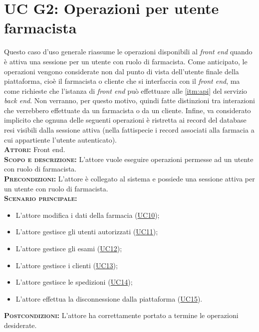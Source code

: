 \section{UC G2: Operazioni per utente farmacista}
\label{sec:UCG2}
Questo caso d'uso generale riassume le operazioni disponibili al \textit{front end} quando è attiva una sessione per un utente con ruolo di farmacista. Come anticipato, le operazioni vengono considerate non dal punto di vista dell'utente finale della piattaforma, cioè il farmacista o cliente che si interfaccia con il \textit{front end}, ma come richieste che l'istanza di \textit{front end} può effettuare alle \ref{itm:api} del servizio \textit{back end}. Non verranno, per questo motivo, quindi fatte distinzioni tra interazioni che verrebbero effettuate da un farmacista o da un cliente. Infine, va considerato implicito che ognuna delle seguenti operazioni è ristretta ai record del database resi visibili dalla sessione attiva (nella fattispecie i record associati alla farmacia a cui appartiente l'utente autenticato).\\
\textsc{\textbf{Attori:}} Front end.\\
\textsc{\textbf{Scopo e descrizione:}} L'attore vuole eseguire operazioni permesse ad un utente con ruolo di farmacista.\\
\textsc{\textsc{\textbf{Precondizioni:}}} L'attore è collegato al sistema e possiede una sessione attiva per un utente con ruolo di farmacista.\\
\textsc{\textbf{Scenario principale:}} 
\begin{itemize}
    \item L'attore modifica i dati della farmacia (\hyperref[sec:UC10]{UC10});
    \item L'attore gestisce gli utenti autorizzati (\hyperref[sec:UC11]{UC11});
    \item L'attore gestisce gli esami (\hyperref[sec:UC12]{UC12});
    \item L'attore gestisce i clienti (\hyperref[sec:UC13]{UC13});
    \item L'attore gestisce le spedizioni (\hyperref[sec:UC14]{UC14});
    \item L'attore effettua la disconnessione dalla piattaforma (\hyperref[sec:UC15]{UC15}).
\end{itemize}
\textsc{\textbf{Postcondizioni:}} L'attore ha correttamente portato a termine le operazioni desiderate.

